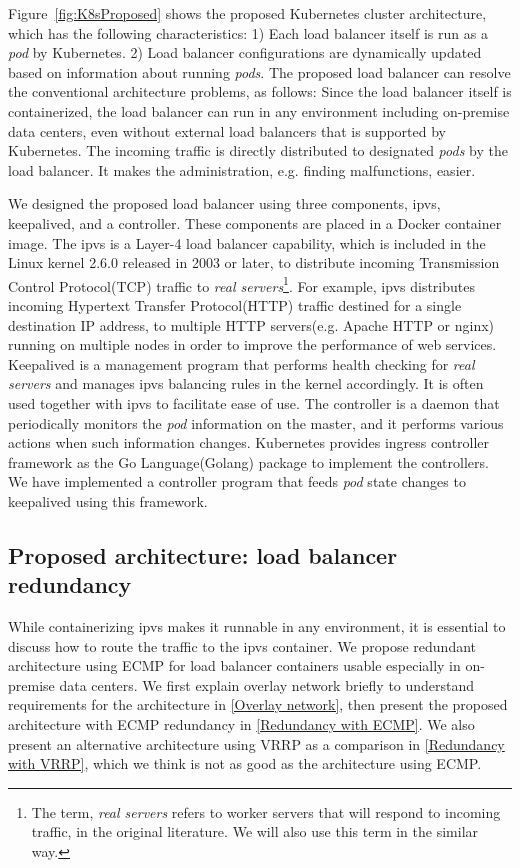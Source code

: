 Figure~\ref{fig:K8sProposed} shows the proposed  Kubernetes cluster architecture, 
which has the following characteristics:
1) Each load balancer itself is run as a {\em pod} by Kubernetes. 
2) Load balancer configurations are dynamically updated based on information about running {\em pods}.
The proposed load balancer can resolve the conventional architecture problems, as follows:
Since the load balancer itself is containerized, the load balancer can run in any environment including on-premise data centers, 
even without external load balancers that is supported by Kubernetes.
The incoming traffic is directly distributed to designated {\em pods} by the load balancer. 
It makes the administration, e.g. finding malfunctions, easier.

We designed the proposed load balancer using three components, ipvs, keepalived, and a controller. 
These components are placed in a Docker container image.
The ipvs is a Layer-4 load balancer capability, which is included in the Linux kernel 2.6.0 released in 2003 or later, 
to distribute incoming Transmission Control Protocol(TCP) traffic to 
{\em real servers}\footnote{The term, {\em real servers} refers to worker servers that will respond to incoming traffic, 
in the original literature\cite{Zhang2000}. We will also use this term in the similar way.}\cite{Zhang2000}. 
For example, ipvs distributes incoming Hypertext Transfer Protocol(HTTP) traffic destined for a single destination IP address, 
to multiple HTTP servers(e.g. Apache HTTP or nginx) running on multiple nodes in order to improve the performance of web services.
Keepalived is a management program that performs health checking for {\em real servers}
and manages ipvs balancing rules in the kernel accordingly.
It is often used together with ipvs to facilitate ease of use.
The controller is a daemon that periodically monitors the {\em pod} information on the master, 
and it performs various actions when such information changes.
Kubernetes provides ingress controller framework as the Go Language(Golang) package to implement the controllers. 
We have implemented a controller program that feeds {\em pod} state changes to keepalived 
using this framework. 

\subsection{Proposed architecture: load balancer redundancy}

While containerizing ipvs makes it runnable in any environment, it is essential to discuss how to route the traffic to the ipvs container.
We propose redundant architecture using ECMP for load balancer containers usable especially in on-premise data centers.
We first explain overlay network briefly to understand requirements for the architecture in \ref{Overlay network}, then present the proposed architecture with ECMP redundancy in \ref{Redundancy with ECMP}. 
We also present an alternative architecture using VRRP as a comparison in \ref{Redundancy with VRRP}, which we think is not as good as the architecture using ECMP. 

